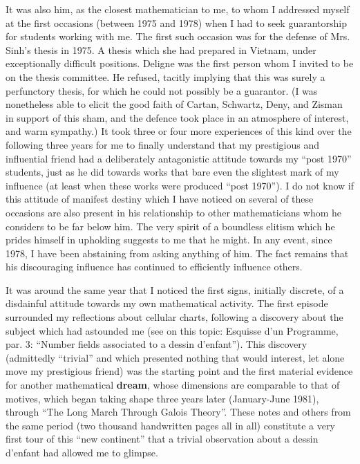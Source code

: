 It was also him, as the closest mathematician to me, to whom I addressed myself 
at the first occasions (between 1975 and 1978)
when I had to seek guarantorship for students working with me.
The first such occasion was for the defense of Mrs. Sinh's thesis in 1975. A thesis which
she had prepared in Vietnam, under exceptionally difficult positions. Deligne was the
first person whom I invited to be on the thesis committee. 
He refused, tacitly implying that this was surely a perfunctory thesis, for which he could
not possibly be a guarantor.
(I was nonetheless able to elicit 
the good faith of Cartan, Schwartz, Deny, and Zisman 
in support of this sham, and the defence took place in an atmosphere of interest, and warm
sympathy.)
It took three or four more experiences of this kind over the following three years for me
to finally understand that my prestigious and influential friend had a deliberately
antagonistic attitude towards my ``post 1970'' students, just as he did towards works that
bare even the slightest mark of my influence (at least when these works were produced
``post 1970'').
I do not know if this attitude of manifest destiny which I have noticed on several of
these occasions are also present in his relationship to other mathematicians whom he
considers to be far below him.
The very spirit of a boundless elitism which he prides himself in 
upholding suggests to me that he might.
In any event, since 1978, I have been abstaining from asking anything of him. 
The fact remains that his discouraging influence has continued to efficiently influence
others.

It was around the same year that I noticed the first signs, initially discrete, of a
disdainful attitude towards my own mathematical activity. The first episode surrounded my
reflections about cellular charts, following a discovery about the subject which had
astounded me (see on this topic: Esquisse d'un Programme, par. 3:
``Number fields associated to a dessin d'enfant'').
This discovery (admittedly ``trivial'' and which presented nothing that would interest,
let alone move my prestigious friend) was the starting point and the first material
evidence for another mathematical \textbf{dream}, whose dimensions are comparable to that
of motives, which began taking shape three years later (January-June 1981),
through ``The Long March Through Galois Theory''. 
These notes and others from the same period (two thousand handwritten pages all in all)
constitute a very first tour of this ``new continent'' that a trivial observation about a
dessin d'enfant had allowed me to glimpse. 

